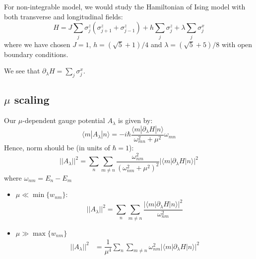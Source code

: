 \documentclass[11pt,a4paper]{article}
\begin{document}
For non-integrable model, we would study the Hamiltonian of Ising model with both transverse and longitudinal fields:
\begin{equation}
H= J \sum_{j} \sigma_j^z (\sigma_{j+1}^z+ \sigma_{j-1}^z) + h\sum_{j} \sigma_j^z +\lambda \sum_{j} \sigma_j^x 
\end{equation}
where we have chosen $J=1$, $h= (\sqrt{5}+1)/4$ and $\lambda=(\sqrt{5}+5)/8$ with open boundary conditions.

We see that $\partial_{\lambda}H =  \sum_{j} \sigma_j^x  $. \\

\subsection{$\mu$ scaling}
Our $\mu$-dependent gauge potential $A_{\lambda}$ is given by:
\begin{equation}
\langle m |A_{\lambda} | n \rangle =  -i \hbar \dfrac{\langle m |\partial_{\lambda}H | n \rangle}{\omega_{mn}^2+ \mu^2} \omega_{mn}
\end{equation}
Hence, norm should be (in units of $\hbar=1$):
\begin{equation}
||A_{\lambda}||^2 = \sum_n \sum_{m \neq n}  \dfrac{\omega_{nm}^2}{(\omega_{nm}^2 + \mu^2)^2} |\langle m | \partial_{\lambda}H| n \rangle|^2
\end{equation}
where $\omega_{nm}=E_n-E_m$
\begin{itemize}
\item $\mu \ll \min\{w_{nm}\}$:
\begin{equation}
||A_{\lambda}||^2 = \sum_n \sum_{m \neq n}  \dfrac{|\langle m | \partial_{\lambda}H| n \rangle|^2}{\omega_{nm}^2} 
\end{equation}
\item $\mu \gg \max\{w_{nm}\} $
\begin{align*}
||A_{\lambda}||^2 &= \dfrac{1}{ \mu^4} \sum_n \sum_{m \neq n}  \omega_{nm}^2 |\langle m | \partial_{\lambda}H| n \rangle|^2 \\

\end{align*}
\end{itemize}
\end{document}
